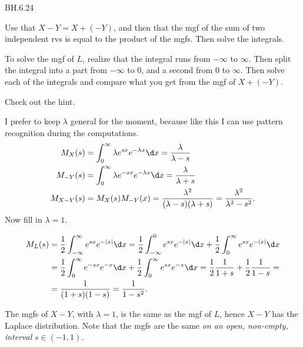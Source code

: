 
\setcounter{theorem}{23}
\begin{exercise} BH.6.24
\begin{hint}
Use that $X-Y = X+(-Y)$, and then that the mgf of the sum of two independent rvs  is equal to the product of the mgfs. Then solve the integrals.

To solve the mgf of $L$, realize that the integral runs from $-\infty$ to $\infty$. Then split the integral into a part from $-\infty$ to 0, and a second from $0$ to $\infty$. Then solve each of the integrals and compare what you get from the mgf of $X+(-Y)$.
\end{hint}

\begin{solution}
Check out the hint.

I prefer to keep $\lambda$ general for the moment, because like this I can use pattern recognition during the computations.
\begin{align*}
  M_{X}(s) &= \int_0^{\infty} \lambda e^{sx} e^{-\lambda x}\d x = \frac{\lambda}{\lambda - s}\\
  M_{-Y}(s) &= \int_0^{\infty} \lambda e^{-sx} e^{-\lambda x}\d x = \frac{\lambda}{\lambda +s}\\
  M_{X-Y}(s) &= M_X(s) M_{-Y}(x) = \frac{\lambda^{2}}{(\lambda-s)(\lambda+s)} = \frac{\lambda^{2}}{\lambda^{2}-s^2}.
\end{align*}
Now fill in $\lambda=1$.

\begin{align*}
  M_L(s) &= \frac{1}{2}\int_{-\infty}^{\infty} e^{sx} e^{-|x|}\d x = \frac{1}{2} \int_{-\infty}^{0} e^{sx} e^{-|x|}\d x + \frac{1}{2} \int_{0}^{\infty} e^{sx} e^{-|x|}\d x  \\
 &= \frac{1}{2} \int_{0}^{\infty} e^{-sx} e^{-x}\d x + \frac{1}{2} \int_{0}^{\infty} e^{sx} e^{-x}\d x  = \frac{1}{2} \frac{1}{1+s} + \frac{1}{2}\frac{1}{1-s} = \\
&=\frac{1}{(1+s)(1-s)} = \frac{1}{1-s^{2}}.
\end{align*}

The  mgfs of $X-Y$, with $\lambda=1$, is the  same as the mgf of $L$, hence $X-Y$ has the Laplace distribution. Note that the mgfs are the same \emph{on an open, non-empty, interval} $s\in (-1, 1)$.
\end{solution}
\end{exercise}

